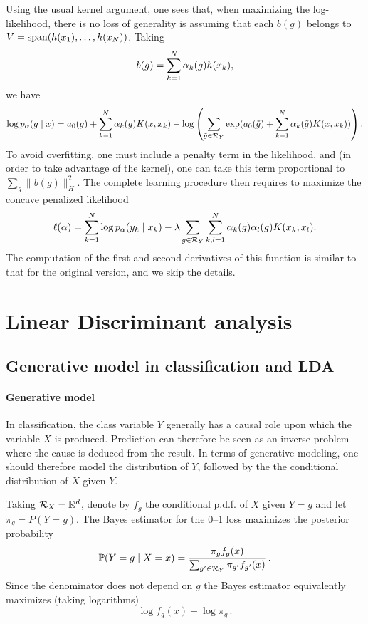  Using the usual kernel argument, one sees that, when maximizing the log-likelihood, there is no loss of generality is assuming that each $b(g)$ belongs to $V = \mathrm{span}(h(x_1), \ldots, h(x_N))$.
 Taking
\[
b(g) = \sum_{k=1}^N \alpha_k(g) h(x_k),
\]
we have
\begin{multline*}
\log p_\alpha(g\mid x) = {a_0}(g) +  \sum_{k=1}^N \alpha_k(g) K(x, x_k) 
- \log\left(\sum_{\tilde g\in {\mathcal R}_Y
}\exp({a_0}(\tilde g) + \sum_{k=1}^N \alpha_k(\tilde g) K(x, x_k))\right).
\end{multline*}
To avoid overfitting, one must include a penalty term in the likelihood, and (in order to take advantage of the kernel), one can take this term proportional to $\sum_g \|b(g)\|_H^2$. The complete learning procedure then
requires to maximize the concave penalized likelihood$$
\ell(\alpha) = \sum_{k=1}^N \log p_\alpha(y_k\mid x_k) - \lambda \sum_{g\in{\mathcal R}_Y}
\sum_{k,l=1}^N \alpha_k(g)\alpha_l(g) K(x_k,x_l).
$$
 The computation of the first and second derivatives of this function is similar to that for the original version, and we skip the details.


\section{Linear Discriminant analysis}
\label{sec:lda}

\subsection{Generative model in classification and LDA}

\paragraph{Generative model}
In  classification, the class variable $Y$ generally has a causal role upon which the variable $X$ is produced. Prediction can therefore be seen as an inverse problem where the cause is deduced from the result. In terms of generative modeling, one should therefore model the distribution of $Y$, followed by the the conditional distribution of $X$ given $Y$.

Taking ${\mathcal R}_X = {\mathbb{R}}^d$, denote by  $f_g$ the conditional p.d.f. of $X$ given $Y=g$ and let $\pi_g =
P(Y=g)$.
The Bayes estimator for the 0--1 loss maximizes the posterior probability
$$
\bm{\mathbb P}(Y=g\mid X=x) = \frac{\pi_g f_g(x)}{\sum_{g'\in {\mathcal R}_Y} \pi_{g'} f_{g'}(x)}\,.
$$
Since the denominator does not depend on $g$  the Bayes estimator equivalently maximizes (taking logarithms)
\[
\log f_g(x) + \log \pi_g\,.
\]

